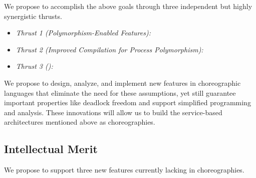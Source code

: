 We propose to accomplish the above goals through three independent but highly synergistic thrusts.
\begin{itemize}
  \item \textit{Thrust 1 (Polymorphism-Enabled Features):}
  \item \textit{Thrust 2 (Improved Compilation for Process Polymorphism):}
  \item \textit{Thrust 3 ():}
\end{itemize}



\iffalse
We propose to design, analyze, and implement new features in choreographic languages that eliminate the need for these assumptions,
yet still guarantee important properties like deadlock freedom and support simplified programming and analysis.
These innovations will allow us to build the service-based architectures mentioned above as choreographies.

\subsection{Intellectual Merit}
We propose to support three new features currently lacking in choreographies.

